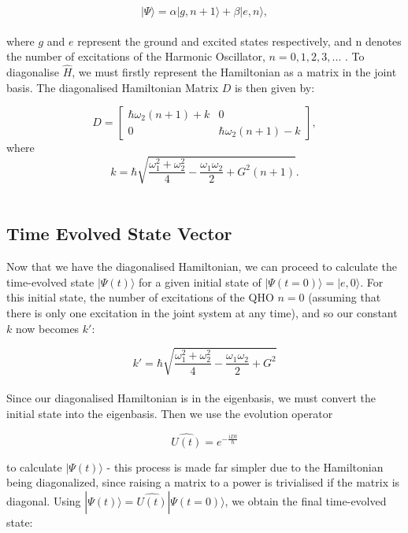\documentclass[12pt,a4paper]{article}
\begin{document}
\begin{equation}
    |\Psi\rangle = \alpha|g,n+1\rangle + \beta|e,n\rangle \label{joint_state},
\end{equation}
\\
where $g$ and $e$ represent the ground and excited states respectively, and n denotes the number of excitations of the Harmonic Oscillator, $n=0,1,2,3,...$ . To diagonalise $\hat{H}$, we must firstly represent the Hamiltonian as a matrix in the joint basis. The diagonalised Hamiltonian Matrix $D$ is then given by:

\begin{equation}
D = \begin{bmatrix}
\hbar\omega_2(n+1) + k & 0 \\
0 & \hbar\omega_2(n+1) - k
\end{bmatrix},
\end{equation}
\vspace{2cm}
where 
\begin{equation*}
    k = \hbar\sqrt{\frac{\omega_1^2 + \omega_2^2}{4}-\frac{\omega_1\omega_2}{2}+G^2(n+1)}.  
\end{equation*}
\\
\subsection{\normalsize{Time Evolved State Vector}}

Now that we have the diagonalised Hamiltonian, we can proceed to calculate the time-evolved state $|\Psi(t)\rangle$ for a given initial state of $|\Psi(t=0)\rangle = |e,0\rangle$. For this initial state, the number of excitations of the QHO $n=0$ (assuming that there is only one excitation in the joint system at any time), and so our constant $k$ now becomes $k'$:

\begin{equation*}
    k' = \hbar\sqrt{\frac{\omega_1^2 + \omega_2^2}{4}-\frac{\omega_1\omega_2}{2}+G^2}
\end{equation*}
\\
Since our diagonalised Hamiltonian is in the eigenbasis, we must convert the initial state into the eigenbasis. Then we use the evolution operator

\begin{equation}
    \hat{U(t)} = e^{-\frac{iDt}{\hbar}}
\end{equation}

to calculate $|\Psi(t)\rangle$ - this process is made far simpler due to the Hamiltonian being diagonalized, since raising a matrix to a power is trivialised if the matrix is diagonal. Using $|\Psi(t)\rangle = \hat{U(t)}|\Psi(t=0)\rangle$, we obtain the final time-evolved state:
\end{document}
